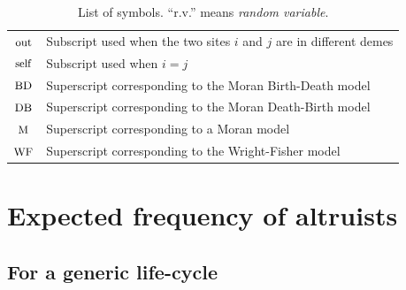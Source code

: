 \documentclass[11pt, letterpaper]{article}
\newcommand{\appname}[0]{Appendix}
\newcommand{\Moran}{\textrm{M}}
\newcommand{\BD}{\textrm{BD}}
\newcommand{\DB}{\textrm{DB}}
\newcommand{\WF}{\textrm{WF}}
\newcommand{\self}{\textrm{self}}
\newcommand{\out}{\textrm{out}}
\begin{document}
\begin{table}[h!]
\begin{tabular}{>{$}c<{$} l}
\small{\out} & Subscript used when the two sites $i$ and $j$ are in different demes\\
\small{\self} & Subscript used when $i=j$\\
\hline
\small{\BD} & Superscript corresponding to the Moran Birth-Death model\\
\small{\DB} & Superscript corresponding to the Moran Death-Birth model\\
\small{\Moran} & Superscript corresponding to a Moran model\\
\small{\WF} & Superscript corresponding to the Wright-Fisher model
\end{tabular}
\caption{List of symbols. ``r.v.'' means \textit{random variable}. }
\label{tab:symbols}
\end{table}
\clearpage

\appendix
 
\renewcommand{\theequation}{\thesection.\arabic{equation}}
\setcounter{equation}{0}  %
 
%
\begin{center}
{\color{seccol}{\LARGE \bfseries \appname}}
\end{center}

\pagestyle{appendix}
\singlespace


\section{Expected frequency of altruists\label{sec:app:EX}}



\subsection{For a generic life-cycle \label{sec:app:generic}}
\end{document}
